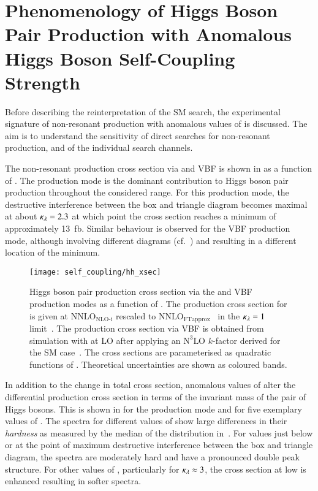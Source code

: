 \section{Phenomenology of Higgs Boson Pair Production with Anomalous
  Higgs Boson Self-Coupling Strength}%
\label{sec:self_coupling_pheno}

Before describing the reinterpretation of the SM \HH search, the
experimental signature of non-resonant \HH production with anomalous
values of \klambda is discussed. The aim is to understand the
sensitivity of direct searches for non-resonant \HH production, and of
the individual search channels.

The non-resonant \HH production cross section via \ggF and VBF is
shown in  as a function of \klambda. The \ggF
production mode is the dominant contribution to Higgs boson pair
production throughout the considered \klambda range. For this
production mode, the destructive interference between the box and
triangle diagram becomes maximal at about $\kappa_{\lambda} = 2.3$ at which
point the cross section reaches a minimum of approximately
\SI{13}{\femto\barn}. Similar behaviour is observed for the VBF
production mode, although involving different diagrams (cf.\
) and resulting in a
different location of the minimum.

\begin{figure}[htbp]
  \centering

  \texttt{[image: self\_coupling/hh\_xsec]}

  \caption{Higgs boson pair production cross section via the \ggF and VBF
    production modes as a function of \klambda. The production cross section for
    \ggF is given at $\text{NNLO}_{\text{NLO-i}}$ rescaled to
    $\text{NNLO}_{\text{FTapprox}}$~\cite{Grazzini:2018bsd} in the
    $\kappa_{\lambda} = 1$ limit~\cite{Amoroso:2020lgh,Baglio:2020wgt,LHCHWGHH}. The
    production cross section via VBF is obtained from simulation with \MGNLO at
    LO after applying an $\text{N}^3\text{LO}$ $k$-factor derived for the SM
    case~\cite{Dreyer:2018qbw,LHCHWGHH}. The cross sections are parameterised as
    quadratic functions of \klambda. Theoretical uncertainties are shown as
    coloured bands.}%
  \label{fig:hh_xsec_incl}
\end{figure}

In addition to the change in total cross section, anomalous values of \klambda
alter the differential \HH production cross section in terms of the invariant
mass of the pair of Higgs bosons. This is shown in \Cref{fig:hh_xsec_mhh} for
the \ggF production mode and for five exemplary values of \klambda. The \mHH
spectra for different values of \klambda show large differences in their
\emph{hardness} as measured by the median of the \mHH distribution
in~\Cref{fig:hh_median_mhh}. For \klambda values just below or at the point of
maximum destructive interference between the box and triangle diagram, the \mHH
spectra are moderately hard and have a pronounced double peak structure. For
other values of \klambda, particularly for $\kappa_{\lambda} \approx 3$, the cross
section at low \mHH is enhanced resulting in softer \mHH spectra.

